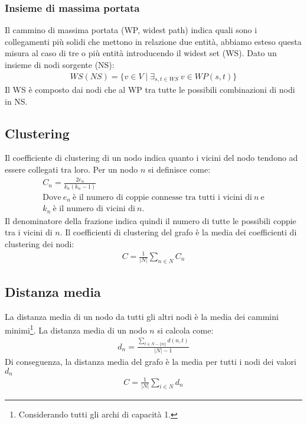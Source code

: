 \documentclass[12pt]{report}
\begin{document}
\subsubsection{Insieme di massima portata \label{WS}}

Il cammino di massima portata (WP, widest path) indica quali sono i collegamenti più solidi che mettono in relazione due entità, abbiamo esteso questa misura al caso di tre o più entità introducendo il widest set (WS). Dato un insieme di nodi sorgente (NS):
\begin{gather}
    WS(NS) = \{v \in V \mid \exists_{s, t \in WS} \  v \in WP(s, t)\}
\end{gather}
Il WS è composto dai nodi che al WP tra tutte le possibili combinazioni di nodi in NS.

\subsection{Clustering}

Il coefficiente di clustering di un nodo indica quanto i vicini del nodo tendono ad essere collegati tra loro. Per un nodo $n$ si definisce come:
\begin{gather}
    C_n = \frac{2e_n}{k_n(k_n - 1)}\\
    \nonumber \mbox{Dove} \  e_n \  \mbox{è il numero di coppie connesse tra tutti i vicini di}\  n \  \mbox{e} \\
    \nonumber k_n \ \mbox{è il numero di vicini di}\  n.
\end{gather}
Il denominatore della frazione indica quindi il numero di tutte le possibili coppie tra i vicini di $n$.
Il coefficienti di clustering del grafo è la media dei coefficienti di clustering dei nodi:
\begin{gather}
    C = \frac{1}{|N|}\sum_{n \in N}C_n
\end{gather}

\subsection{Distanza media}

La distanza media di un nodo da tutti gli altri nodi è la media dei cammini minimi\footnote{Considerando tutti gli archi di capacità 1.}. La distanza media di un nodo $n$ si calcola come:
\begin{gather}
	d_n = \frac{\sum_{t \in N - \{n\}}d(n, t)}{|N| - 1}
\end{gather}
Di conseguenza, la distanza media del grafo è la media per tutti i nodi dei valori $d_n$
\begin{gather}
    C = \frac{1}{|N|}\sum_{i \in N}d_n
\end{gather}
\end{document}
